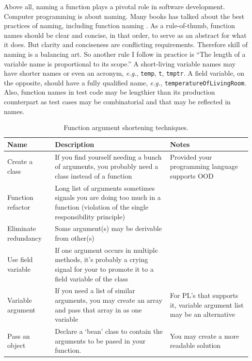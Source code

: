\documentclass[oneside,11pt]{book}
\theoremstyle{definition}
\theoremstyle{remark}
\newcommand{\code}[1]{\mbox{\lstinline{#1}}}
\begin{document}
Above all, naming a function plays a pivotal role in software development.
Computer programming is about naming.
Many books has talked about the best practices of naming, including function naming
\cite{Martin-R-2009, Mcconnell.2004}.
As a rule-of-thumb, function names should be clear and concise, in that order, to serve as an
abstract for what it does.
But clarity and conciseness are conflicting requirements.
Therefore skill of naming is a balancing art.
So another rule I follow in practice is ``The length of a variable name is proportional to its
scope.''
A short-living variable names may have shorter names or even an acronym, \textit{e.g.}, \code{temp},
\code{t}, \code{tmptr}.
A field variable, on the opposite, should have a fully qualified name, \textit{e.g.},
\code{temperatureOfLivingRoom}.
Also, function names in test code may be lengthier than its production counterpart as test cases
may be combinatorial and that may be reflected in names.

\begin{table}[h]
    \begin{center}
        \caption{Function argument shortening techniques.\label{tbl:arg-shorten-tech}}
        \begin{tabular}{|l|p{5cm}|p{3cm}|}
            \hline
            Name & Description & Notes \\
            \hline
            Create a class
            & If you find yourself needing a bunch of arguments, you
            probably need a class instead of a function
            & Provided your programming language supports OOD \\
            \hline
            Function refactor
            & Long list of arguments sometimes signals you are doing
            too much in a function (violation of the single responsibility principle)
            & \\
            \hline
            Eliminate redundancy
            & Some argument(s) may be derivable from other(s)
            & \\
            \hline
            Use field variable
            & If one argument occurs in multiple methods, it's probably a
            crying signal for your to promote it to a field variable of the class
            & \\
            \hline
            Variable argument
            & If you need a list of similar arguments, you may create an array
            and pass that array in as one variable
            & For PL's that supports it, variable argument list may be an alternative \\
            \hline
            Pass an object
            & Declare a `bean' class to contain the arguments to be pased in your function.
            & You may create a more readable solution \\
            \hline
        \end{tabular}
    \end{center}
\end{table}
\end{document}
